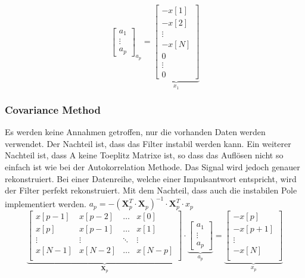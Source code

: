 \begin{aufzaehlung}
$${\begin{bmatrix}
    		a_1 \\
    		\vdots \\
    		a_p
		\end{bmatrix}  }_{a_p}= \underbrace{\begin{bmatrix}
    		 -x [1]\\            
    		 -x [2]\\
    		\vdots \\
    		 -x [N]\\
    		0 \\
    		\vdots \\
    		0
		\end{bmatrix}}_{x_1} 
		 $$ \normalsize
	\end{aufzaehlung}
	
\subsubsection{Covariance Method  }
Es werden keine Annahmen getroffen, nur die vorhanden Daten werden verwendet. Der Nachteil ist, dass das Filter instabil werden kann. 
Ein weiterer Nachteil ist, dass A keine Toeplitz Matrixe ist, so dass das Auflösen nicht so einfach ist wie bei der Autokorrelation Methode. 
Das Signal wird jedoch genauer rekonstruiert. Bei einer Datenreihe, welche einer Impulsantwort entspricht, wird der Filter perfekt rekonstruiert. 
Mit dem Nachteil, dass auch die instabilen Pole implementiert werden. $a_p = -\left(\bm X_p^T \cdot \bm  X_p\right)^{-1} \cdot \bm X_p^T \cdot x_p$  \small
		$$
		\underbrace{\begin{bmatrix}               
    		x[p-1] & x[p-2] & \hdots & x[0] \\                                   
    		x[p] & x[p-1] & \hdots & x[1] \\      
    		\vdots & \vdots & \ddots & \vdots \\                        
    		x[N-1] & x[N-2] & \hdots & x[N-p] \\ 
		\end{bmatrix}  }_{\bm X_p} \cdot \underbrace{\begin{bmatrix}
    		a_1 \\
    		\vdots \\
    		a_p
		\end{bmatrix}  }_{a_p}= \underbrace{\begin{bmatrix}
    		 -x[p]\\            
    		 -x[p+1]\\
    		\vdots \\
    		 -x[N]\\
		\end{bmatrix}}_{x_p} 
		 $$ \normalsize
\vspace{-0.6cm}


